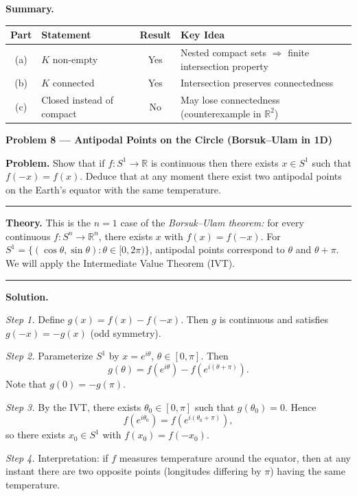 \documentclass[12pt,a4paper]{article}
\theoremstyle{plain}
\theoremstyle{definition}
\theoremstyle{remark}
\theoremstyle{remark}
\newcommand{\probheader}[1]{%
	\par\vspace{8pt}%
	{\Large\bfseries #1\par}%
	\vspace{6pt}%
}
\newcommand{\sep}{\vspace{6pt}\hrule\vspace{8pt}}
\begin{document}
	\textbf{Summary.}
	
	\begin{center}
		\begin{tabular}{c|l|c|l}
			Part & Statement & Result & Key Idea\\\hline
			(a) & $K$ non-empty & Yes & Nested compact sets $\Rightarrow$ finite intersection property\\
			(b) & $K$ connected & Yes & Intersection preserves connectedness\\
			(c) & Closed instead of compact & No & May lose connectedness (counterexample in $\mathbb{R}^2$)
		\end{tabular}
	\end{center}
	
	\probheader{Problem 8 — Antipodal Points on the Circle (Borsuk–Ulam in 1D)}
	
	\textbf{Problem.}
	Show that if $f:S^1\to\mathbb{R}$ is continuous then there exists $x\in S^1$
	such that $f(-x)=f(x)$.
	Deduce that at any moment there exist two antipodal points on the Earth's equator
	with the same temperature.
	
	\sep
	
	\textbf{Theory.}
	This is the $n=1$ case of the \emph{Borsuk--Ulam theorem:}
	for every continuous $f:S^n\to\mathbb{R}^n$, there exists $x$ with $f(x)=f(-x)$.
	For $S^1=\{(\cos\theta,\sin\theta):\theta\in[0,2\pi)\}$,
	antipodal points correspond to $\theta$ and $\theta+\pi$.
	We will apply the Intermediate Value Theorem (IVT).
	
	\sep
	
	\textbf{Solution.}
	
	\textit{Step 1.} Define $g(x)=f(x)-f(-x)$.
	Then $g$ is continuous and satisfies $g(-x)=-g(x)$ (odd symmetry).
	
	\medskip
	
	\textit{Step 2.} Parameterize $S^1$ by $x=e^{i\theta}$, $\theta\in[0,\pi]$.
	Then
	\[
	g(\theta)=f(e^{i\theta})-f(e^{i(\theta+\pi)}).
	\]
	Note that $g(0)=-g(\pi)$.
	
	\medskip
	
	\textit{Step 3.} By the IVT, there exists $\theta_0\in[0,\pi]$ such that $g(\theta_0)=0$.
	Hence
	\[
	f(e^{i\theta_0}) = f(e^{i(\theta_0+\pi)}),
	\]
	so there exists $x_0\in S^1$ with $f(x_0)=f(-x_0)$.
	
	\medskip
	
	\textit{Step 4.} Interpretation:
	if $f$ measures temperature around the equator,
	then at any instant there are two opposite points
	(longitudes differing by $\pi$) having the same temperature.
	
\end{document}
